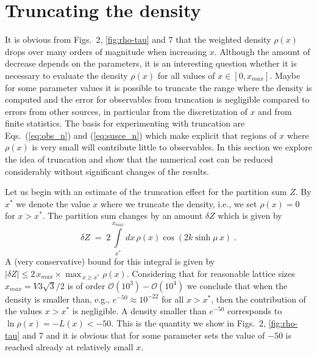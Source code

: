 \documentclass[a4paper,11pt]{article}
\begin{document}
\section{Truncating the density}

It is obvious from Figs.~2, \ref{fig:rho-tau} and 7 that the weighted density $\rho(x)$ drops over many orders of 
magnitude when increasing $x$. Although the amount of decrease depends on the parameters, it is an 
interesting question whether it is necessary to evaluate the density $\rho(x)$ for all values of $x \in [0,x_{max}]$.  
Maybe for some parameter values it is possible to truncate the range where the density is computed and the error 
for observables from truncation is negligible compared to errors from other sources, in particular from the discretization 
of $x$ and from finite statistics. The basis for experimenting with truncation are Eqs.~(\ref{eq:obs_n}) and 
(\ref{eq:susce_n}) which make explicit that regions of $x$ where $\rho(x)$ is very small will contribute
little to observables. In this section we explore the idea of truncation and show that the numerical cost can be 
reduced considerably without significant changes of the results. 

Let us begin with an estimate of the truncation effect for the partition sum $Z$. By $x^*$ we denote the value $x$ 
where we truncate the density, i.e., we set $\rho(x) = 0$ for $x > x^*$. The partition sum changes by an amount 
$\delta Z$ which is given by
%
\begin{equation}
\delta  Z \; = \; 2 \!\! \int\limits_{x^*}^{x_{max}} \!\! dx \, \rho(x) \cos( 2 k \sinh \! \mu \, x)  \; .
\end{equation}  
%
A (very conservative) bound for this integral is given
by $| \delta Z | \leq 2 \, x_{max}  \times \max_{\, x \geq x^*} \rho(x)$.  
Considering that for reasonable lattice sizes $x_{max} = V 3 \sqrt{3}/2$ is of order 
$\mathcal{O}(10^3)-\mathcal{O}(10^4)$ we conclude that when the density is smaller than, e.g., 
$e^{-50} \approx 10^{-22}$ for all $x > x^*$, then the contribution of the values $x > x^*$ is negligible. A density 
smaller than $e^{-50}$ corresponds to $\ln \rho(x) = - L(x) < -50$. This is the quantity we show in Figs.~2, \ref{fig:rho-tau} 
and 7 and it is obvious that for some parameter sets the value of $-50$ is reached already at relatively small $x$.
\end{document}

